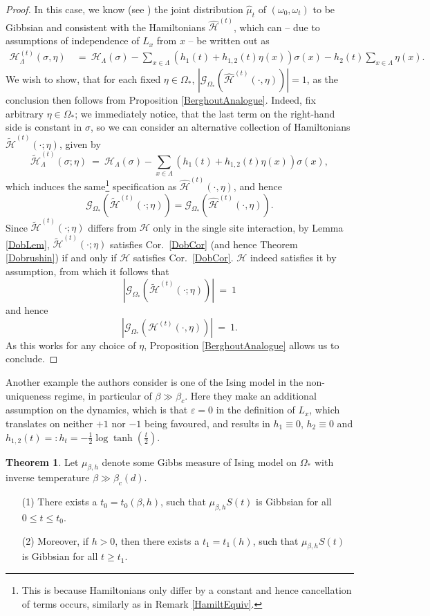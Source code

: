 \documentclass[12pt]{article}
\newcommand{\G}{\mathcal{G}}
\renewcommand{\H}{\mathcal{H}}
\newcommand{\oklepaj}[1]{\left(#1\right)}
\newcommand{\pika}{\boldsymbol{\cdot}}
\newcommand{\1}{\mathbbm{1}}
\newcommand{\5}{\vspace{0.5cm}}
\renewcommand{\tilde}{\widetilde}
\renewcommand{\hat}{\widehat}
\theoremstyle{definition}
\newtheorem{thm}{Theorem}[section]
\begin{document}
\begin{proof}
In this case, we know (see \cite{EFHR}) the joint distribution $\hat{\mu}_t$ of $(\omega_0,\omega_t)$ to be Gibbsian and consistent with the Hamiltonians $\hat{\H}^{(t)}$, which can -- due to assumptions of independence of $L_x$ from $x$ -- be written out as
\begin{align*}
\H_\Lambda^{(t)}(\sigma,\eta) ~&=~ \H_\Lambda(\sigma) - \sum_{x\in\Lambda}\oklepaj{h_1(t)+h_{1,2}(t)\eta(x)}\sigma(x) - h_2(t)\sum_{x\in\Lambda}\eta(x).
\end{align*}
We wish to show, that for each fixed $\eta\in\Omega_*$, $|\G_{\Omega_*}(\hat{\H}^{(t)}(\pika,\eta))|=1$, as the conclusion then follows from Proposition \ref{BerghoutAnalogue}. Indeed, fix arbitrary $\eta\in\Omega_*$; we immediately notice, that the last term on the right-hand side is constant in $\sigma$, so we can consider an alternative collection of Hamiltonians $\tilde{\H}^{(t)}(\pika;\eta)$, given by
$$\tilde{\H}_\Lambda^{(t)}(\sigma;\eta) ~=~ \H_\Lambda(\sigma) - \sum_{x\in\Lambda}\oklepaj{h_1(t)+h_{1,2}(t)\eta(x)}\sigma(x),$$
which induces the same\footnote{This is because Hamiltonians only differ by a constant and hence cancellation of terms occurs, similarly as in Remark \ref{HamiltEquiv}.} specification as $\hat{\H}^{(t)}(\pika,\eta)$, and hence 
$$\G_{\Omega_*}(\tilde{\H}^{(t)}(\pika;\eta))=\G_{\Omega_*}(\hat{\H}^{(t)}(\pika,\eta)).$$
Since $\tilde{\H}^{(t)}(\pika;\eta)$ differs from $\H$ only in the single site interaction, by Lemma \ref{DobLem}, $\tilde{\H}^{(t)}(\pika;\eta)$ satisfies Cor.~\ref{DobCor} (and hence Theorem \ref{Dobrushin}) if and only if $\H$ satisfies Cor.~\ref{DobCor}. $\H$ indeed satisfies it by assumption, from which it follows that 
$$|\G_{\Omega_*}(\tilde{\H}^{(t)}(\pika;\eta))|~=~1$$
and hence 
$$|\G_{\Omega_*}(\H^{(t)}(\pika,\eta))|~=~1.$$
As this works for any choice of $\eta$, Proposition \ref{BerghoutAnalogue} allows us to conclude.
\end{proof}

Another example the authors consider is one of the Ising model in the non-uniqueness regime, in particular of $\beta\gg\beta_c$. Here they make an additional assumption on the dynamics, which is that $\varepsilon=0$ in the definition of $L_x$, which translates on neither $+1$ nor $-1$ being favoured, and results in $h_1\equiv 0$, $h_2\equiv 0$ and $h_{1,2}(t)=:h_t=-\frac{1}{2}\log\tanh(\frac{t}{2})$.

\begin{thm}\label{IsingTHM}
Let $\mu_{\beta,h}$ denote some Gibbs measure of Ising model on $\Omega_*$ with inverse temperature $\beta\gg\beta_c(d)$.
\begin{itemize}
	\item[(1)] There exists a $t_0=t_0(\beta,h)$, such that $\mu_{\beta,h}S(t)$ is Gibbsian for all $0\leq t\leq t_0$.
	\item[(2)] Moreover, if $h>0$, then there exists a $t_1=t_1(h)$, such that $\mu_{\beta,h}S(t)$ is Gibbsian for all $t\geq t_1$.
\end{itemize} 
\end{thm}
\end{document}
